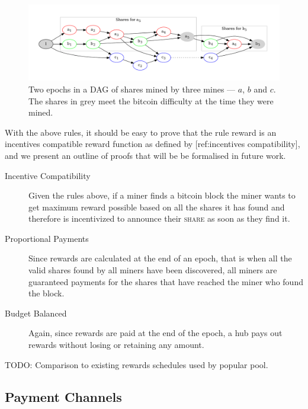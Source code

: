 \documentclass{article}
\begin{document}
\begin{figure}[h]
  \begin{center}
    \includegraphics[width=1.0\textwidth]{shares-dag}
    \caption{Two epochs in a DAG of shares mined by three mines ---
      $a$, $b$ and $c$. The shares in grey meet the bitcoin difficulty
      at the time they were mined.}\label{fig:shares-dag}
  \end{center}
\end{figure}

With the above rules, it should be easy to prove that the rule reward
is an incentives compatible reward function as defined by
[ref:incentives compatibility], and we present an outline of proofs
that will be be formalised in future work.

\begin{description}
  \item [Incentive Compatibility] Given the rules above, if a miner
    finds a bitcoin block the miner wants to get maximum reward
    possible based on all the shares it has found and therefore is
    incentivized to announce their \textsc{share} as soon as they find
    it.
  \item [Proportional Payments] Since rewards are calculated at the
    end of an epoch, that is when all the valid shares found by all
    miners have been discovered, all miners are guaranteed payments
    for the shares that have reached the miner who found the block.
  \item [Budget Balanced] Again, since rewards are paid at the end of
    the epoch, a hub pays out rewards without losing or retaining any
    amount.
\end{description}

TODO: Comparison to existing rewards schedules used by popular pool.


\subsection{Payment Channels}\label{ref:channels}
\end{document}
